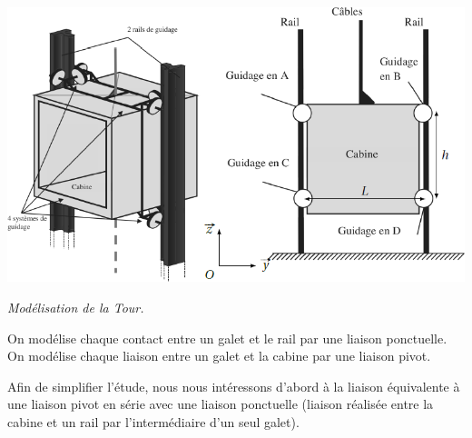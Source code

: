 \documentclass[10pt,fleqn]{article} %
\begin{document}
\begin{multicols}{2}
\begin{multicols}{2}
\begin{center}
\includegraphics[width=\linewidth]{images/fig_03}

\textit{Modélisation de la Tour.}
\end{center}

%
%
%

On modélise chaque contact entre un galet et le rail par une liaison 
ponctuelle.  On modélise chaque liaison entre un galet et la cabine par une liaison pivot.

Afin de simplifier l'étude, nous nous intéressons d'abord à la liaison équivalente à une liaison pivot en série avec une liaison ponctuelle (liaison réalisée entre la cabine et un rail par l'intermédiaire d'un seul galet).


\end{multicols}
\end{multicols}
\end{document}
